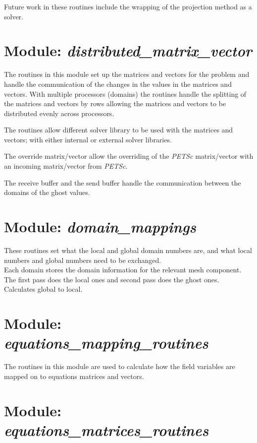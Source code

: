 Future work in these routines include the wrapping of the projection method
as a solver.


\section{Module: \emph{distributed\_matrix\_vector}}
\label{sec:distributedmatrixvector}

The routines in this module set up the matrices and vectors for the problem 
and handle the communication of the changes in the values in the matrices and 
vectors. With multiple processors (domains) the routines handle the splitting 
of the matrices and vectors by rows allowing the matrices and vectors to be
distributed evenly across processors. 

The routines allow different solver library to be used with the matrices and 
vectors; with either internal or external solver libraries.

The override matrix/vector allow the overriding of the \emph{PETSc}
matrix/vector with an incoming matrix/vector from \emph{PETSc}.

The receive buffer and the send buffer handle the communication between the 
domains of the ghost values.


\section{Module: \emph{domain\_mappings}} 
\label{sec:domainmappings}

These routines set what the local and global domain numbers are, and what 
local numbers and global numbers need to be exchanged. \\
Each domain stores the domain information for the relevant mesh component. \\
The first pass does the local ones and second pass does the ghost ones. \\
Calculates global to local.


\section{Module: \emph{equations\_mapping\_routines}}
\label{sec:equationsmappingroutines}

The routines in this module are used to calculate how the field variables 
are mapped on to equations matrices and vectors.


\section{Module: \emph{equations\_matrices\_routines}}
\label{sec:equationsmatricesroutines}

